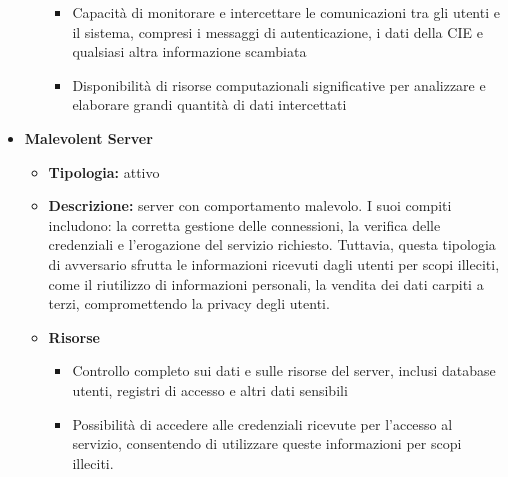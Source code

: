 \begin{itemize}
\begin{itemize}
\begin{itemize}
                        \vspace{3mm}

                        \item Capacità di monitorare e intercettare le comunicazioni tra gli utenti e il sistema, compresi i messaggi di autenticazione, i dati della CIE e qualsiasi altra informazione scambiata

                        \vspace{3mm}

                        \item Disponibilità di risorse computazionali significative per analizzare e elaborare grandi quantità di dati intercettati
                    \end{itemize}
            \end{itemize}


        \item \textbf{Malevolent Server}
            \begin{itemize}
                \item \textbf{Tipologia:} attivo
                
                \item \textbf{Descrizione:} server con comportamento malevolo.
                I suoi compiti includono: la corretta gestione delle connessioni, la verifica delle credenziali e l'erogazione del servizio richiesto.
                Tuttavia, questa tipologia di avversario sfrutta le informazioni ricevuti dagli utenti per scopi illeciti, come il riutilizzo di informazioni personali, la vendita dei dati carpiti a terzi, compromettendo la privacy degli utenti.
                
                \item \textbf{Risorse}
                    \begin{itemize}
                        \item Controllo completo sui dati e sulle risorse del server, inclusi database utenti, registri di accesso e altri dati sensibili

                        \vspace{3mm}

                        \item Possibilità di accedere alle credenziali ricevute per l'accesso al servizio, consentendo di utilizzare queste informazioni per scopi illeciti.
                    \end{itemize}
            \end{itemize}



\end{itemize}
